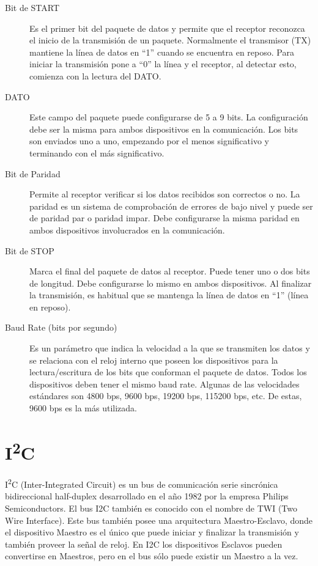 \begin{description}
   \item[Bit de START] Es el primer bit del paquete de datos y permite que el receptor reconozca el inicio de la transmisión de un paquete. Normalmente el transmisor (TX) mantiene la línea de datos en “1” cuando se encuentra en reposo. Para iniciar la transmisión pone a “0” la línea y el receptor, al detectar esto, comienza con la lectura del DATO.
   \item[DATO] Este campo del paquete puede configurarse de 5 a 9 bits. La configuración debe ser la misma para ambos dispositivos en la comunicación. Los bits son enviados uno a uno, empezando por el menos significativo y terminando con el más significativo.
   \item[Bit de Paridad] Permite al receptor verificar si los datos recibidos son correctos o no. La paridad es un sistema de comprobación de errores de bajo nivel y puede ser de paridad par o paridad impar. Debe configurarse la misma paridad en ambos dispositivos involucrados en la comunicación.
   \item[Bit de STOP] Marca el final del paquete de datos al receptor. Puede tener uno o dos bits de longitud. Debe configurarse lo mismo en ambos dispositivos. Al finalizar la transmisión, es habitual que se mantenga la línea de datos en “1” (línea en reposo).
   \item[Baud Rate (bits por segundo)]  Es un parámetro que indica la velocidad a la que se transmiten los datos y se relaciona con el reloj interno que poseen los dispositivos para la lectura/escritura de los bits que conforman el paquete de datos. Todos los dispositivos deben tener el mismo baud rate. Algunas de las velocidades estándares son 4800 bps, 9600 bps, 19200 bps, 115200 bps, etc. De estas, 9600 bps es la más utilizada.
\end{description}

\section{I\texorpdfstring{\textsuperscript{2}}{Lg}C}

I\textsuperscript{2}C (Inter-Integrated Circuit) \cite{fernandez-com-serial} es un bus de comunicación serie sincrónica bidireccional half-duplex desarrollado en el año 1982 por la empresa Philips Semiconductors. El bus I2C también es conocido con el nombre de TWI (Two Wire Interface). Este bus también posee una arquitectura Maestro-Esclavo, donde el dispositivo Maestro es el único que puede iniciar y finalizar la transmisión y también proveer la señal de reloj. En I2C los dispositivos Esclavos pueden convertirse en Maestros, pero en el bus sólo puede existir un Maestro a la vez.

